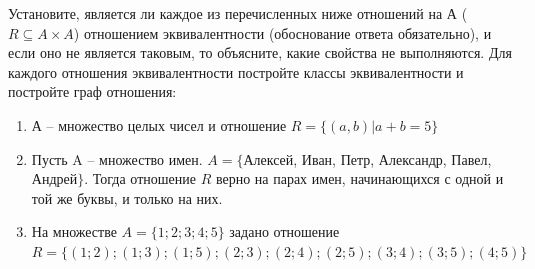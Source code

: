 \question
Установите, является ли каждое из перечисленных ниже отношений на А ($R \subseteq A \times A$) отношением эквивалентности (обоснование ответа обязательно), и если оно не является таковым, то объясните, какие свойства не выполняются. Для каждого отношения эквивалентности постройте классы эквивалентности и постройте граф отношения:
\begin{enumerate}
	\renewcommand{\labelenumi}{\alph{enumi})}
	\item А -- множество целых чисел и отношение $R = \{(a,b)|a + b = 5\}$
	\item Пусть A – множество имен. $A = \{ $Алексей, Иван, Петр, Александр, Павел, Андрей$ \}$. Тогда отношение $R $ верно на парах имен, начинающихся с одной и той же буквы, и только на них.
	\item На множестве $A = \{1; 2; 3; 4; 5\}$ задано отношение $R = \{(1; 2); (1; 3); (1; 5); (2; 3); (2; 4); (2; 5); (3; 4); (3; 5); (4; 5)\}$
\end{enumerate}